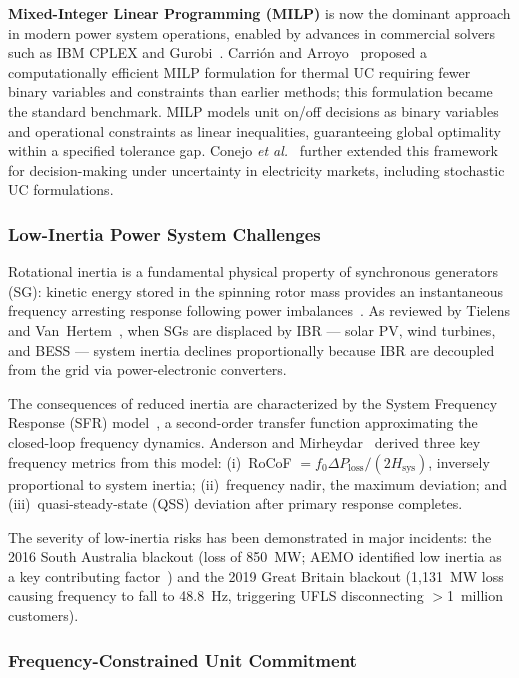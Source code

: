 \documentclass[journal]{IEEEtran}
\begin{document}
\textbf{Mixed-Integer Linear Programming (MILP)} is now the
dominant approach in modern power system operations, enabled by
advances in commercial solvers such as IBM CPLEX and
Gurobi~\cite{Carrion2006}. Carri\'on and Arroyo~\cite{Carrion2006}
proposed a computationally efficient MILP formulation for thermal
UC requiring fewer binary variables and constraints than earlier
methods; this formulation became the standard benchmark.
MILP models unit on/off decisions as binary variables and
operational constraints as linear inequalities, guaranteeing
global optimality within a specified tolerance gap.
Conejo \textit{et al.}~\cite{Conejo2010} further extended this
framework for decision-making under uncertainty in electricity
markets, including stochastic UC formulations.

\subsubsection{Low-Inertia Power System Challenges}

Rotational inertia is a fundamental physical property of
synchronous generators (SG): kinetic energy stored in the spinning
rotor mass provides an instantaneous frequency arresting response
following power imbalances~\cite{Kundur1994}. As reviewed by
Tielens and Van~Hertem~\cite{Tielens2016}, when SGs are displaced
by IBR --- solar PV, wind turbines, and BESS --- system inertia
declines proportionally because IBR are decoupled from the grid
via power-electronic converters.

The consequences of reduced inertia are characterized by the
System Frequency Response (SFR) model~\cite{Anderson1990}, a
second-order transfer function approximating the closed-loop
frequency dynamics. Anderson and Mirheydar~\cite{Anderson1990}
derived three key frequency metrics from this model:
(i)~RoCoF $= f_0 \Delta P_{\text{loss}} / (2 H_{\text{sys}})$,
inversely proportional to system inertia;
(ii)~frequency nadir, the maximum deviation; and
(iii)~quasi-steady-state (QSS) deviation after primary response
completes.

The severity of low-inertia risks has been demonstrated in
major incidents: the 2016 South Australia blackout (loss of
850~MW; AEMO identified low inertia as a key contributing
factor~\cite{AEMO2017}) and the 2019 Great Britain blackout
(1{,}131~MW loss causing frequency to fall to 48.8~Hz, triggering
UFLS disconnecting ${>}$1~million customers).

\subsubsection{Frequency-Constrained Unit Commitment}
\end{document}
